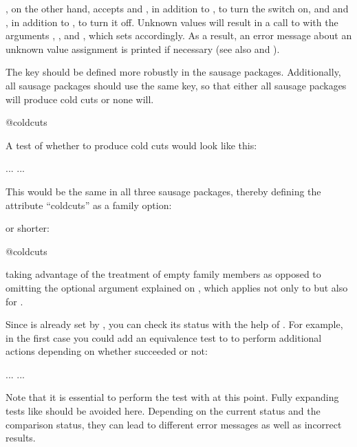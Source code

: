 , on the other hand, accepts  and
, in addition to , to turn the switch on, and
 and , in addition to , to turn it off.
Unknown values will result in a call to
 with the arguments
, , and , which sets
 accordingly. As a result, an error
message about an unknown value assignment is printed if necessary (see also
 and
).
\begin{Example}
  The key  should be defined more robustly in the sausage
  packages. Additionally, all sausage packages should use the same key, so
  that either all sausage packages will produce cold cuts or none will.
\begin{lstcode}
                         {@coldcuts}
\end{lstcode}
  A test of whether to produce cold cuts would look like this:
\begin{lstcode}
  \if@coldcuts
     ...
  \else
     ...
  \fi
\end{lstcode}
  This would be the same in all three sausage packages, thereby
  defining the attribute ``coldcuts'' as a family option:
  or shorter:
\begin{lstcode}
                           {@coldcuts}
\end{lstcode}
  taking advantage of the treatment of empty family members as opposed to
  omitting the optional argument explained on
  , which applies not only
  to  but also for
  .

  Since  is already set by
  , you can check its status with the help of
  . For example, in the first case you
  could add an equivalence test to  to perform additional
  actions depending on whether  succeeded or not:
  \begin{lstcode}
    \ifx\FamilyKeyState\FamilyKeyStateProcessed
        ...
    \else
        ...
    \fi
  \end{lstcode}
  Note that it is essential to perform the test with
   at this point. Fully expanding tests like  should
  be avoided here. Depending on the current status and the comparison status,
  they can lead to different error messages as well as incorrect results.
\end{Example}%
\EndIndexGroup

